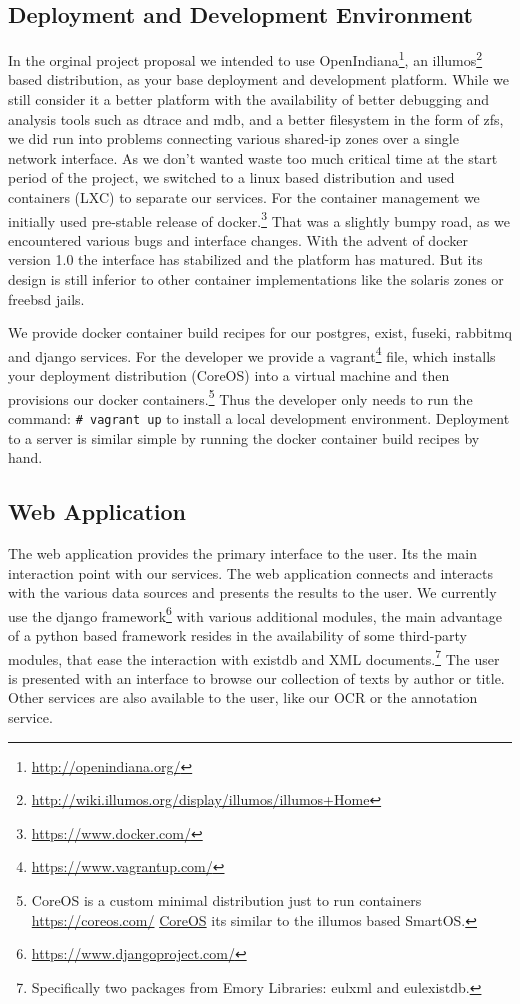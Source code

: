\documentclass[12pt, draft]{article}
\begin{document}
\subsection{Deployment and Development Environment}

In the orginal project proposal we intended to use OpenIndiana\footnote{\url{http://openindiana.org/}},
an illumos\footnote{\url{http://wiki.illumos.org/display/illumos/illumos+Home}}
 based distribution, as your base deployment and development
platform.
While we still consider it a better platform with
the availability of better debugging and analysis tools
such as dtrace and mdb, and a better filesystem in the form of zfs,
we did run into problems connecting various shared-ip zones over a single network interface.
As we don't wanted waste too much critical time at the
start period of the project, we switched to a linux based
distribution and used containers (LXC) to separate our
services.  For the container management we initially
used pre-stable release of docker.\footnote{\url{https://www.docker.com/}}
That was a slightly
bumpy road, as we encountered various bugs and interface changes.
With the advent of docker version 1.0 the interface has
stabilized and the platform has matured.
But its design is still inferior to other
container implementations like the solaris zones or freebsd jails.

We provide docker container build recipes for our
postgres, exist, fuseki, rabbitmq and django services.
For the developer we provide a vagrant\footnote{\url{https://www.vagrantup.com/}}
 file, which 
installs your deployment distribution (CoreOS)
into a virtual machine and then provisions our
docker containers.\footnote{CoreOS is a custom minimal distribution just to run
containers \url{https://coreos.com/} \href{https://coreos.com/}{CoreOS} its similar to the illumos based SmartOS.}
Thus the developer only needs to run the command: \lstinline´# vagrant up´
to install a local development environment.
Deployment to a server is similar simple by running the docker container build recipes
by hand.

\subsection{Web Application}

The web application provides the primary interface to the user. Its the main
interaction point with our services.
The web application connects and interacts with the various data sources and presents
the results to the user.
We currently use the django framework\footnote{\url{https://www.djangoproject.com/}}
 with various additional modules,
the main advantage of a python based framework resides in the availability
of some third-party modules, that ease the interaction with existdb and XML
documents.\footnote{Specifically two packages from Emory Libraries: eulxml and eulexistdb.}
The user is presented with an interface to browse our collection of texts by
author or title.  Other services are also available to the user, like our
OCR or the annotation service.
\end{document}
